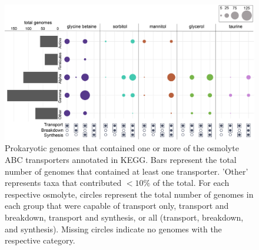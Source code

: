 \documentclass[utf8]{frontiersSCNS} %
\begin{document}
\begin{figure}[b!]
    \centering
    \includegraphics[width = 0.9\columnwidth]{Figures/transportersummary.png}
    \caption{Prokaryotic genomes that contained one or more of the osmolyte ABC transporters annotated in KEGG. Bars represent the total number of genomes that contained at least one transporter. 'Other' represents taxa that contributed $<10\%$ of the total. For each respective osmolyte, circles represent the total number of genomes in each group that were capable of transport only, transport and breakdown, transport and synthesis, or all (transport, breakdown, and synthesis). Missing circles indicate no genomes with the respective category.  }
    \label{fig:transporters}
\end{figure}
\end{document}
